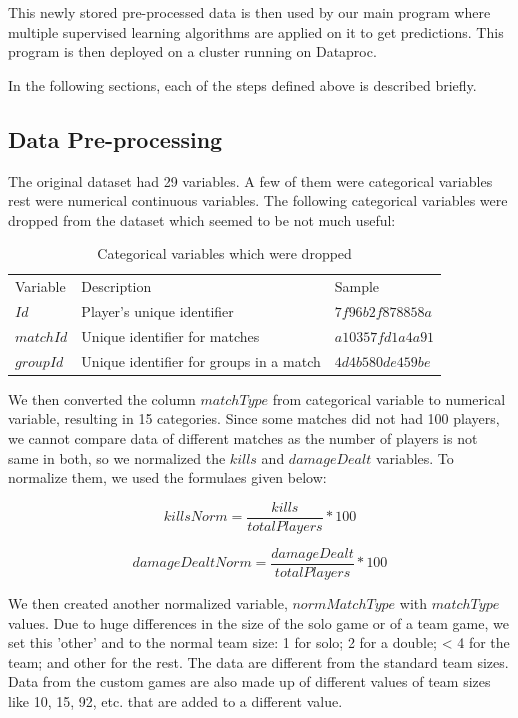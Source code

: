 \documentclass[journal,twoside,web]{ieeecolor}
\begin{document}
This newly stored pre-processed data is then used by our main program where multiple supervised learning algorithms are applied on it to get predictions. This program is then deployed on a cluster running on Dataproc.

In the following sections, each of the steps defined above is described briefly.

\subsection{Data Pre-processing}
The original dataset had 29 variables. A few of them were categorical variables rest were numerical continuous variables. The following categorical variables were dropped from the dataset which seemed to be not much useful:

\begin{table}[h]
    \caption{Categorical variables which were dropped}
    \label{tab:cat_variables}
	\centering
    \begin{tabular}{l l l}
    \toprule
    \multirow{2}{*}{Variable} & \multirow{2}{*}{Description} & \multirow{2}{*}{Sample} \\ 
    && \\ \midrule
    $Id$ & Player's unique identifier & $7f96b2f878858a$ \\ \midrule
    $matchId$ & Unique identifier for matches & $a10357fd1a4a91$ \\ \midrule
    $groupId$ & Unique identifier for groups in a match & $4d4b580de459be$  \\
    \bottomrule
    \end{tabular}
\end{table}

We then converted the column $matchType$ from categorical variable to numerical variable, resulting in 15 categories. Since some matches did not had 100 players, we cannot compare data of different matches as the number of players is not same in both, so we normalized the $kills$ and $damageDealt$ variables. To normalize them, we used the formulaes given below:

\[ killsNorm = \frac{kills}{totalPlayers} * 100 \]

\[ damageDealtNorm = \frac{damageDealt}{totalPlayers} * 100 \]

We then created another normalized variable, $normMatchType$ with $matchType$ values. Due to huge differences in the size of the solo game or of a team game, we set this 'other' and to the normal team size: 1 for solo; 2 for a double; < 4 for the team; and other for the rest. The data are different from the standard team sizes. Data from the custom games are also made up of different values of team sizes like 10, 15, 92, etc. that are added to a different value.
\end{document}
